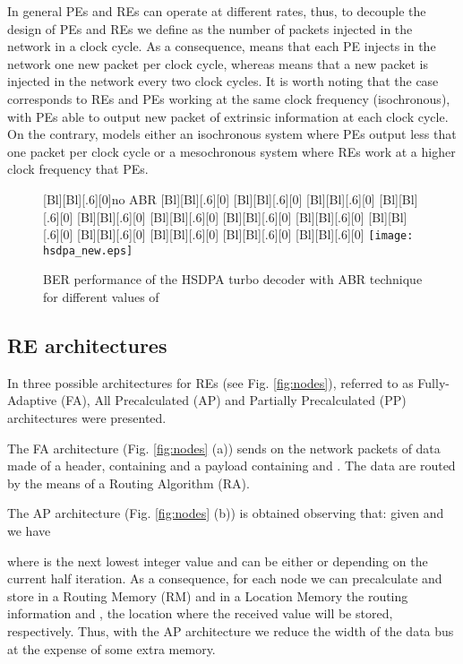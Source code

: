 \documentclass[10pt,twocolumn,journal]{IEEEtran}
\begin{document}
In general PEs and REs can operate at different rates, thus, 
to decouple the design of PEs and REs we define  as the number of packets injected in the network in a clock cycle. 
As a consequence,  means that each PE injects in the network one new packet per clock cycle, whereas 
 means that a new packet is injected in the network every two clock cycles. It is worth noting that 
the case  corresponds to REs and PEs working at the same clock frequency (isochronous), 
with PEs able to output new packet of extrinsic information at each clock cycle. 
On the contrary,  models either an isochronous system where PEs output less that one packet per clock cycle 
or a mesochronous system where REs work at a higher clock frequency that PEs. 
\begin{figure}[t!]
  \centering
  [Bl][Bl][.6][0]{no ABR}
  [Bl][Bl][.6][0]{}
  [Bl][Bl][.6][0]{}
  [Bl][Bl][.6][0]{}
  [Bl][Bl][.6][0]{}
  [Bl][Bl][.6][0]{}
  [Bl][Bl][.6][0]{}
  [Bl][Bl][.6][0]{}
  [Bl][Bl][.6][0]{}
  [Bl][Bl][.6][0]{}
  [Bl][Bl][.6][0]{}
  [Bl][Bl][.6][0]{}
  [Bl][Bl][.6][0]{}
  [Bl][Bl][.6][0]{}
  \texttt{[image: hsdpa\_new.eps]}
\caption{BER performance of the HSDPA  turbo decoder with ABR technique for different values of } 
\label{fig:hsdpa}
\end{figure}

\subsection{RE architectures}
\label{subsec:REarch}

In \cite{martina_TCASI10} three possible architectures for REs (see 
Fig. \ref{fig:nodes}), referred to as 
Fully-Adaptive (FA), All Precalculated (AP) and Partially Precalculated (PP) architectures were presented. 

The FA architecture (Fig. \ref{fig:nodes} (a)) sends on the network packets of data made of a header, containing 
and a payload containing  and . The data are routed by the means of 
a Routing Algorithm (RA).

The AP architecture (Fig. \ref{fig:nodes} (b)) is obtained observing that: given  and  we have

where  is the next lowest integer value and 
 can be either  or  depending on the current half iteration.
As a consequence, for each node we can precalculate and store in a Routing Memory (RM) and in a Location Memory 
the routing information and , the location where the received value  
will be stored, respectively. Thus, with the AP architecture we reduce the width of the data bus at the expense of 
some extra memory. 
\end{document}
